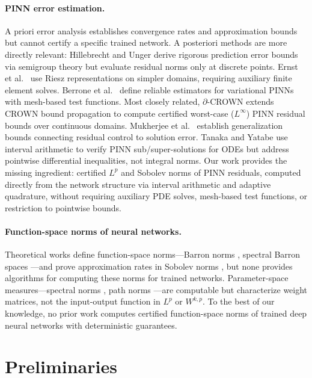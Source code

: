 \documentclass[a4paper, 11pt]{article}
\begin{document}
\paragraph{PINN error estimation.}
A priori error analysis \cite{DeRyck2024,Lorenz2024,Doumeche2025} establishes
convergence rates and approximation bounds but cannot certify a specific trained
network. A posteriori methods are more directly relevant: Hillebrecht and Unger
\cite{Hillebrecht2022,Hillebrecht2025} derive rigorous prediction error bounds via
semigroup theory but evaluate residual norms only at discrete points. Ernst et
al.\ \cite{Ernst2025} use Riesz representations on simpler domains, requiring
auxiliary finite element solves. Berrone et al.\ \cite{Berrone2022} define
reliable estimators for variational PINNs with mesh-based test functions. Most
closely related, $\partial$-CROWN \cite{Eiras2024} extends CROWN bound propagation
to compute certified worst-case ($L^\infty$) PINN residual bounds over continuous
domains. Mukherjee et al.\ \cite{Mukherjee2026} establish generalization bounds
connecting residual control to solution error. Tanaka and Yatabe \cite{Tanaka2026}
use interval arithmetic to verify PINN sub/super-solutions for ODEs but address
pointwise differential inequalities, not integral norms. Our work provides the
missing ingredient: certified $L^p$ and Sobolev norms of PINN residuals, computed
directly from the network structure via interval arithmetic and adaptive
quadrature, without requiring auxiliary PDE solves, mesh-based test functions, or
restriction to pointwise bounds.
 
\paragraph{Function-space norms of neural networks.}
Theoretical works define function-space norms---Barron norms \cite{E2022}, spectral
Barron spaces \cite{LiaoMing2023}---and prove approximation rates in Sobolev norms
\cite{Guhring2020,SiegelXu2023,DeVore2021}, but none provides algorithms for
computing these norms for trained networks. Parameter-space measures---spectral
norms \cite{Bartlett2017}, path norms \cite{Neyshabur2015,Gonon2024}---are
computable but characterize weight matrices, not the input-output function in $L^p$
or $W^{k,p}$. To the best of our knowledge, no prior work computes certified
function-space norms of trained deep neural networks with deterministic guarantees.
 


	
	\section{Preliminaries}
	
\end{document}
